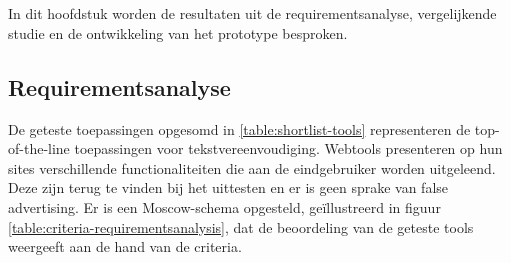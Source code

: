 
\chapter{}%
\label{ch:discussie}

In dit hoofdstuk worden de resultaten uit de requirementsanalyse, vergelijkende studie en de ontwikkeling van het prototype besproken. 

\section{Requirementsanalyse}


De geteste toepassingen opgesomd in \ref{table:shortlist-tools} representeren de top-of-the-line toepassingen voor tekstvereenvoudiging. Webtools presenteren op hun sites verschillende functionaliteiten die aan de eindgebruiker worden uitgeleend. Deze zijn terug te vinden bij het uittesten en er is geen sprake van false advertising. Er is een Moscow-schema opgesteld, geïllustreerd in figuur \ref{table:criteria-requirementsanalysis}, dat de beoordeling van de geteste tools weergeeft aan de hand van de criteria.

